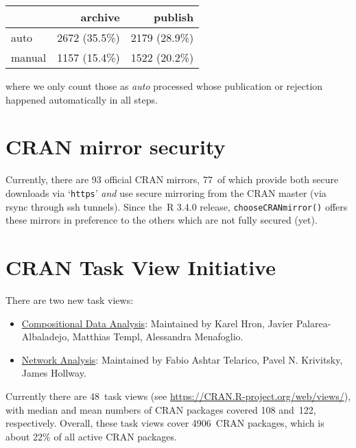 \begin{longtable}[]{@{}lrr@{}}
\toprule\noalign{}
& archive & publish \\
\midrule\noalign{}
\endhead
\bottomrule\noalign{}
\endlastfoot
auto & 2672 (35.5\%) & 2179 (28.9\%) \\
manual & 1157 (15.4\%) & 1522 (20.2\%) \\
\end{longtable}

\noindent where we only count those as \emph{auto} processed whose publication or
rejection happened automatically in all steps.

\section{CRAN mirror security}\label{cran-mirror-security}

Currently, there are 93 official CRAN mirrors,
77~of which provide both
secure downloads via `\texttt{https}' \emph{and} use secure mirroring from the CRAN master
(via rsync through ssh tunnels). Since the~R 3.4.0 release, \texttt{chooseCRANmirror()}
offers these mirrors in preference to the others which are not fully secured (yet).

\section{CRAN Task View Initiative}\label{cran-task-view-initiative}

There are two new task views:

\begin{itemize}
\tightlist
\item
  \href{https://CRAN.R-project.org/view=CompositionalData}{Compositional Data Analysis}: Maintained by Karel Hron, Javier Palarea-Albaladejo, Matthias Templ, Alessandra Menafoglio.
\item
  \href{https://CRAN.R-project.org/view=NetworkAnalysis}{Network Analysis}: Maintained by Fabio Ashtar Telarico, Pavel N. Krivitsky, James Hollway.
\end{itemize}

Currently there are 48~task views (see \url{https://CRAN.R-project.org/web/views/}),
with median and mean numbers of CRAN packages covered
108 and~122, respectively.
Overall, these task views cover 4906~CRAN packages,
which is about 22\% of all active CRAN packages.


\address{%
Kurt Hornik\\
WU Wirtschaftsuniversität Wien\\%
Austria\\
%
%
\textit{ORCiD: \href{https://orcid.org/0000-0003-4198-9911}{0000-0003-4198-9911}}\\%
\href{mailto:Kurt.Hornik@R-project.org}{\nolinkurl{Kurt.Hornik@R-project.org}}%
}


